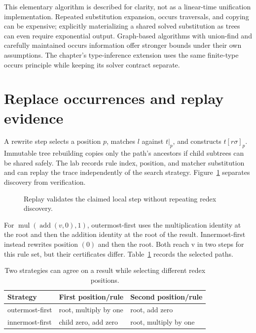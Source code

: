 This elementary algorithm is described for clarity, not as a linear-time unification implementation.
Repeated substitution expansion, occurs traversals, and copying can be expensive; explicitly materializing a shared solved substitution as trees can even require exponential output.
Graph-based algorithms with union-find and carefully maintained occurs information offer stronger bounds under their own assumptions.
The chapter's type-inference extension uses the same finite-type occurs principle while keeping its solver contract separate.

\section{Replace occurrences and replay evidence}
\label{sec:ch82-rewrite}
A rewrite step selects a position $p$, matches $l$ against $t|_p$, and constructs $t[r\sigma]_p$.
Immutable tree rebuilding copies only the path's ancestors if child subtrees can be shared safely.
The lab records rule index, position, and matcher substitution and can replay the trace independently of the search strategy.
Figure~\ref{fig:ch82-trace} separates discovery from verification.

\begin{figure}[htbp]
\centering
{}
\caption{Replay validates the claimed local step without repeating redex discovery.}
\label{fig:ch82-trace}
\end{figure}

For $\operatorname{mul}(\operatorname{add}(v,0),1)$, outermost-first uses the multiplication identity at the root and then the addition identity at the root of the result.
Innermost-first instead rewrites position $(0)$ and then the root.
Both reach v in two steps for this rule set, but their certificates differ.
Table~\ref{tab:ch82-trace} records the selected paths.

\begin{table}[htbp]
\caption{Two strategies can agree on a result while selecting different redex positions.}
\label{tab:ch82-trace}
\centering
\begin{tabular}{lll}
\toprule
Strategy & First position/rule & Second position/rule \\
\midrule
outermost-first & root, multiply by one & root, add zero \\
innermost-first & child zero, add zero & root, multiply by one \\
\bottomrule
\end{tabular}
\end{table}

